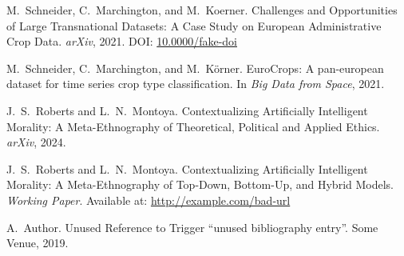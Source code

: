 \documentclass[11pt]{article}
\begin{document}
\begin{thebibliography}{9}

M.~Schneider, C.~Marchington, and M.~Koerner.
\newblock Challenges and Opportunities of Large Transnational Datasets: A Case Study on European Administrative Crop Data.
\newblock \emph{arXiv}, 2021. %
\newblock DOI: \href{https://doi.org/10.0000/fake-doi}{10.0000/fake-doi} %

M.~Schneider, C.~Marchington, and M.~Körner.
\newblock EuroCrops: A pan-european dataset for time series crop type classification.
\newblock In \emph{Big Data from Space}, 2021.

J.~S.~Roberts and L.~N.~Montoya.
\newblock Contextualizing Artificially Intelligent Morality: A Meta-Ethnography of Theoretical, Political and Applied Ethics.
\newblock \emph{arXiv}, 2024. %

J.~S.~Roberts and L.~N.~Montoya.
\newblock Contextualizing Artificially Intelligent Morality: A Meta-Ethnography of Top-Down, Bottom-Up, and Hybrid Models.
\newblock \emph{Working Paper}. Available at: \url{http://example.com/bad-url} %

A.~Author.
\newblock Unused Reference to Trigger ``unused bibliography entry''.
\newblock Some Venue, 2019. %

\end{thebibliography}

\end{document}

